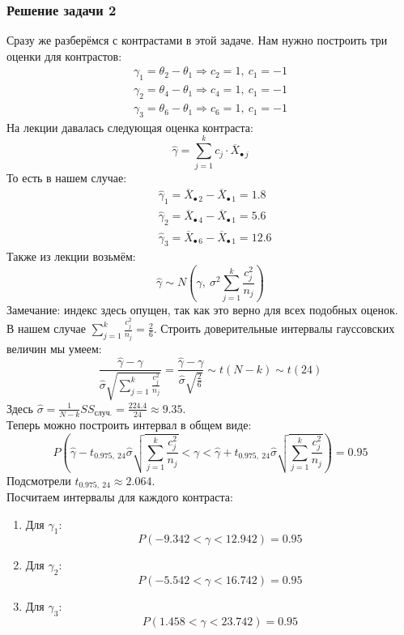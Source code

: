 \documentclass[12pt, a4paper]{article}
\begin{document}
\subsubsection*{Решение задачи 2}
Сразу же разберёмся с контрастами в этой задаче. Нам нужно построить три оценки для контрастов:
\begin{equation*}
    \begin{aligned}
        \gamma_1 = \theta_2 - \theta_1\Rightarrow c_2 = 1,\ c_1 = -1\\
        \gamma_2 = \theta_4 - \theta_1\Rightarrow c_4 = 1,\ c_1 = -1\\
        \gamma_3 = \theta_6 - \theta_1\Rightarrow c_6 = 1,\ c_1 = -1
    \end{aligned}
\end{equation*}
На лекции давалась следующая оценка контраста:
\[\hat \gamma = \sum_{j = 1}^{k} c_j \cdot \overline{X}_{\bullet\, j}\]
То есть в нашем случае:
\begin{equation*}
    \begin{aligned}
        &\hat \gamma_1 = \overline{X}_{\bullet\, 2} - \overline{X}_{\bullet\, 1} = 1.8\\
        &\hat \gamma_2 = \overline{X}_{\bullet\, 4} - \overline{X}_{\bullet\, 1} = 5.6\\
        &\hat \gamma_3 = \overline{X}_{\bullet\, 6} - \overline{X}_{\bullet\, 1} = 12.6
    \end{aligned}
\end{equation*}
Также из лекции возьмём:
\[\hat \gamma \sim N\left( \gamma,\ \sigma^2 \sum_{j = 1}^{k} \frac{c_j^2}{n_j} \right)\]
Замечание: индекс здесь опущен, так как это верно для всех подобных оценок.\\
В нашем случае $\displaystyle \sum_{j = 1}^{k} \frac{c_j^2}{n_j} = \frac{2}{6}$. Строить доверительные интервалы гауссовских величин мы умеем:
\[\frac{\hat \gamma - \gamma}{\hat \sigma \sqrt{\sum_{j = 1}^{k} \frac{c_j^2}{n_j}}} = \frac{\hat \gamma - \gamma}{\hat \sigma \sqrt{\frac{2}{6}}} \sim t(N - k) \sim t(24)\]
Здесь $\hat \sigma = \frac{1}{N - k} SS_{\text{случ.}} = \frac{224.4}{24} \approx 9.35$.\\
Теперь можно построить интервал в общем виде:
\[P\left(\hat \gamma -  t_{0.975,\ 24} \hat \sigma\sqrt{\sum_{j = 1}^{k} \frac{c_j^2}{n_j}} < \gamma < \hat \gamma +  t_{0.975,\ 24} \hat \sigma\sqrt{\sum_{j = 1}^{k} \frac{c_j^2}{n_j}}\right) = 0.95\]
Подсмотрели $t_{0.975,\ 24} \approx 2.064$.\\
Посчитаем интервалы для каждого контраста:
\begin{enumerate}
    \item Для $\gamma_1$:
    \[P\left( -9.342 < \gamma < 12.942 \right) = 0.95\]
    \item Для $\gamma_2$:
    \[P\left( -5.542 < \gamma < 16.742 \right) = 0.95\]
    \item Для $\gamma_3$:
    \[P\left( 1.458 < \gamma < 23.742 \right) = 0.95\]
\end{enumerate}
\end{document}
